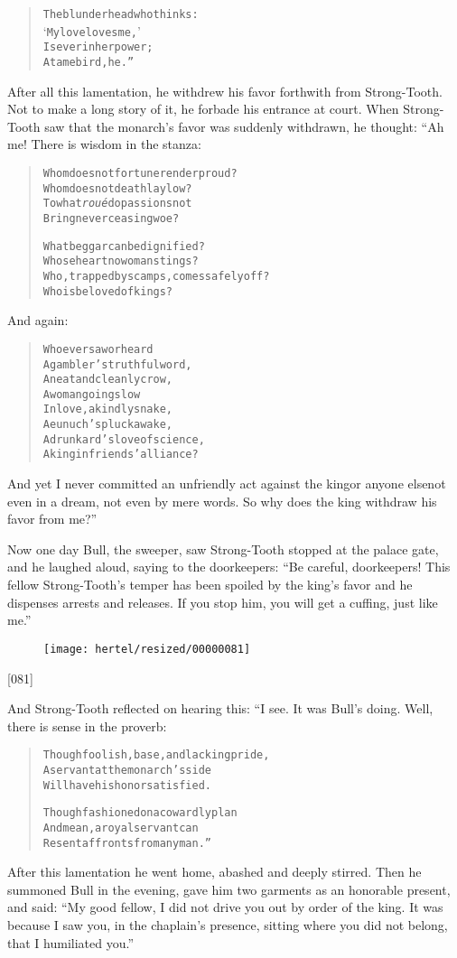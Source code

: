 \documentclass[article, twoside, 10pt]{memoir}
\renewenvironment{verbatim}{%
\begin{quote}%
\vskip -10pt%
\begin{alltt}\normalfont\small}{\end{alltt}%
\end{quote}%
\vskip -10pt
} %
\begin{document}
\begin{verbatim}
The blunderhead who thinks:
    ‘My love loves me,’
Is ever in her power;
    A tame bird, he.”
\end{verbatim}
After all this lamentation, he withdrew his favor forthwith from
Strong-Tooth. Not to make a long story of it, he forbade his
entrance at court. When Strong-Tooth saw that the monarch's favor
was suddenly withdrawn, he thought: “Ah me! There is wisdom in the
stanza:

\begin{verbatim}
Whom does not fortune render proud?
    Whom does not death lay low?
To what \emph{roué} do passions not
    Bring never ceasing woe?

What beggar can be dignified?
    Whose heart no woman stings?
Who, trapped by scamps, comes safely off?
    Who is beloved of kings?
\end{verbatim}
And again:

\begin{verbatim}
Who ever saw or heard
A gambler's truthful word,
A neat and cleanly crow,
A woman going slow
In love, a kindly snake,
A eunuch's pluck awake,
A drunkard's love of science,
A king in friends' alliance?
\end{verbatim}
And yet I never committed an unfriendly act against the king{\textemdash}or
anyone else{\textemdash}not even in a dream, not even by mere words. So why
does the king withdraw his favor from me?”

Now one day Bull, the sweeper, saw Strong-Tooth stopped at the
palace gate, and he laughed aloud, saying to the doorkeepers:
``Be careful, doorkeepers! This fellow Strong-Tooth's temper has been spoiled by the king's favor and he dispenses arrests and releases. If you stop him, you will get a cuffing, just like me.''
\begin{figure}[p]\texttt{[image: hertel/resized/00000081]}\end{figure}[081]

And Strong-Tooth reflected on hearing this: “I see. It was Bull's
doing. Well, there is sense in the proverb:

\begin{verbatim}
Though foolish, base, and lacking pride,
A servant at the monarch's side
Will have his honor satisfied.

Though fashioned on a cowardly plan
And mean, a royal servant can
Resent affronts from any man.”
\end{verbatim}
After this lamentation he went home, abashed and deeply stirred.
Then he summoned Bull in the evening, gave him two garments as an
honorable present, and said:
``My good fellow, I did not drive you out by order of the king. It was because I saw you, in the chaplain's presence, sitting where you did not belong, that I humiliated you.''
\end{document}
